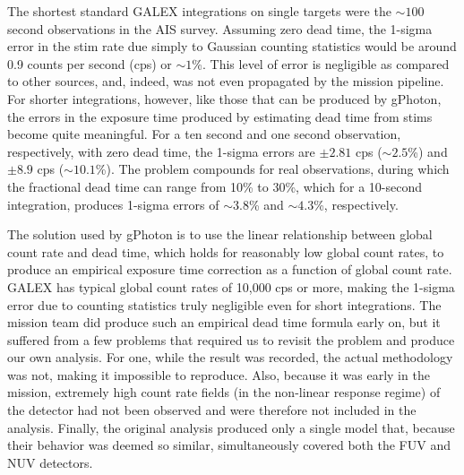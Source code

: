 \documentclass[5p]{elsarticle}
\begin{document}
The shortest standard GALEX integrations on single targets were the $\sim 100$ second observations in the AIS survey. Assuming zero dead time, the 1-sigma error in the stim rate due simply to Gaussian counting statistics would be around 0.9 counts per second (cps) or $\sim 1$\%. This level of error is negligible as compared to other sources, and, indeed, was not even propagated by the mission pipeline. For shorter integrations, however, like those that can be produced by gPhoton, the errors in the exposure time produced by estimating dead time from stims become quite meaningful. For a ten second and one second observation, respectively, with zero dead time, the 1-sigma errors are $\pm 2.81$ cps ($\sim 2.5$\%) and $\pm 8.9$ cps ($\sim 10.1$\%). The problem compounds for real observations, during which the fractional dead time can range from 10\% to 30\%, which for a 10-second integration, produces 1-sigma errors of $\sim 3.8$\% and $\sim 4.3$\%, respectively.

The solution used by gPhoton is to use the linear relationship between global count rate and dead time, which holds for reasonably low global count rates, to produce an empirical exposure time correction as a function of global count rate. GALEX has typical global count rates of 10,000 cps or more, making the 1-sigma error due to counting statistics truly negligible even for short integrations. The mission team did produce such an empirical dead time formula early on, but it suffered from a few problems that required us to revisit the problem and produce our own analysis. For one, while the result was recorded, the actual methodology was not, making it impossible to reproduce. Also, because it was early in the mission, extremely high count rate fields (in the non-linear response regime) of the detector had not been observed and were therefore not included in the analysis. Finally, the original analysis produced only a single model that, because their behavior was deemed so similar, simultaneously covered both the FUV and NUV detectors.
\end{document}
